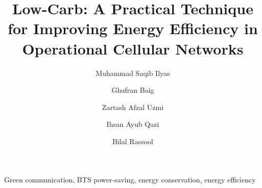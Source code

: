 \documentclass[preprint,12pt]{elsarticle}
\begin{document}
\begin{frontmatter}



\title{Low-Carb: A Practical Technique for Improving Energy Efficiency in Operational Cellular Networks}


\author[LUMS]{Muhammad Saqib Ilyas}
\author[LUMS]{Ghufran Baig}
\author[LUMS]{Zartash Afzal Uzmi}
\author[LUMS]{Ihsan Ayub Qazi}
\author[WaridTel]{Bilal Rassool}
\address[LUMS]{School of Science and Engineering, LUMS, Lahore, Pakistan}
\address[WaridTel]{Warid Telecom, Lahore, Pakistan}




\begin{keyword}

Green communication, BTS power-saving, energy conservation, energy efficiency
\end{keyword}

\end{frontmatter}








\end{document}

